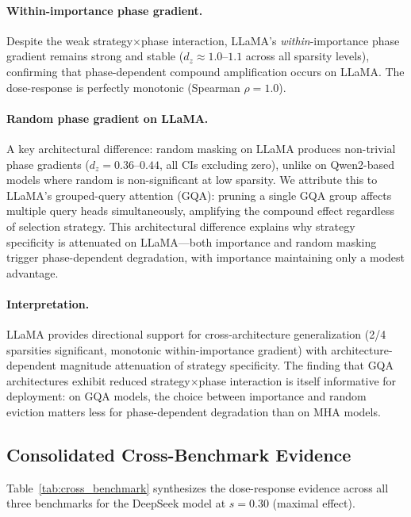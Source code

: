 \documentclass[11pt]{article}
\begin{document}
\paragraph{Within-importance phase gradient.} Despite the weak strategy$\times$phase interaction, LLaMA's \emph{within}-importance phase gradient remains strong and stable ($d_z \approx 1.0$--$1.1$ across all sparsity levels), confirming that phase-dependent compound amplification occurs on LLaMA. The dose-response is perfectly monotonic (Spearman $\rho = 1.0$).

\paragraph{Random phase gradient on LLaMA.} A key architectural difference: random masking on LLaMA produces non-trivial phase gradients ($d_z = 0.36$--$0.44$, all CIs excluding zero), unlike on Qwen2-based models where random is non-significant at low sparsity. We attribute this to LLaMA's grouped-query attention (GQA): pruning a single GQA group affects multiple query heads simultaneously, amplifying the compound effect regardless of selection strategy. This architectural difference explains why strategy specificity is attenuated on LLaMA---both importance and random masking trigger phase-dependent degradation, with importance maintaining only a modest advantage.

\paragraph{Interpretation.} LLaMA provides directional support for cross-architecture generalization (2/4 sparsities significant, monotonic within-importance gradient) with architecture-dependent magnitude attenuation of strategy specificity. The finding that GQA architectures exhibit reduced strategy$\times$phase interaction is itself informative for deployment: on GQA models, the choice between importance and random eviction matters less for phase-dependent degradation than on MHA models.

\subsection{Consolidated Cross-Benchmark Evidence}

Table~\ref{tab:cross_benchmark} synthesizes the dose-response evidence across all three benchmarks for the DeepSeek model at $s=0.30$ (maximal effect).
\end{document}
